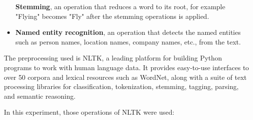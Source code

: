 \documentclass[12pt, a4paper]{article}
\begin{document}
\begin{itemize}
        \begin{minipage}[t]{\linewidth}
        \textbf{Stemming}, an operation that reduces a word to its root, for example "Flying" becomes "Fly" after the stemming operations is applied.
         \end{minipage}  
    \item
        \begin{minipage}[t]{\linewidth}
        \textbf{Named entity recognition}, an operation that detects the named entities such as person names, location names, company names, etc., from the text.
         \end{minipage}  
\end{itemize}

\hfill\break



The preprocessing used is NLTK, a leading platform for building Python programs to work with human language data.
It provides easy-to-use interfaces to over 50 corpora and lexical resources such as WordNet,
along with a suite of text processing libraries for classification, tokenization, stemming, tagging, parsing,
and semantic reasoning.

\hfill\break

In this experiment, those operations of NLTK were used:
\end{document}
